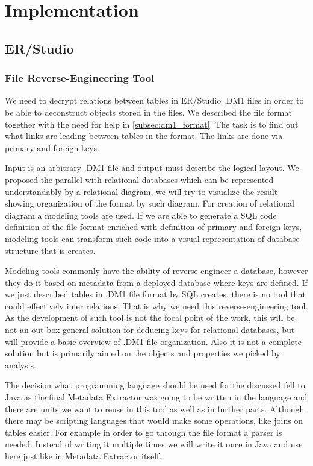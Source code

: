 \chapter{Implementation}



\section{ER/Studio}

\subsection{File Reverse-Engineering Tool}
\label{subsec:dm1_tool}

We need to decrypt relations between tables in ER/Studio .DM1 files in order to be able to deconstruct objects stored in the files. 
We described the file format together with the need for help in \autoref{subsec:dm1_format}.
The task is to find out what links are leading between tables in the format. The links are done via primary and foreign keys.

Input is an arbitrary .DM1 file and output must describe the logical layout. 
We proposed the parallel with relational databases which can be represented understandably by a relational diagram, we will try to visualize the result showing organization of the format by such diagram. 
For creation of relational diagram a modeling tools are used. 
If we are able to generate a SQL code definition of the file format enriched with definition of primary and foreign keys, modeling tools can transform such code into a visual representation of database structure that is creates.

Modeling tools commonly have the ability of reverse engineer a database, however they do it based on metadata from a deployed database where keys are defined. 
If we just described tables in .DM1 file format by SQL creates, there is no tool that could effectively infer relations. That is why we need this reverse-engineering tool.
As the development of such tool is not the focal point of the work, this will be not an out-box general solution for deducing keys for relational databases, but will provide a basic overview of .DM1 file organization. Also it is not a complete solution but is primarily aimed on the objects and properties we picked by analysis. 

The decision what programming language should be used for the discussed fell to Java as the final Metadata Extractor was going to be written in the language and there are units we want to reuse in this tool as well as in further parts. Although there may be scripting languages that would make some operations, like joins on tables easier.
For example in order to go through the file format a parser is needed. Instead of writing it multiple times we will write it once in Java and use here just like in Metadata Extractor itself. \\

